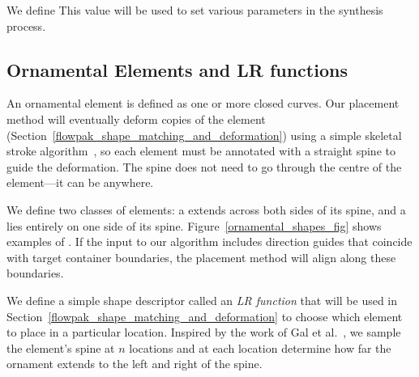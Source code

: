 We define 
This value will be used to set various parameters in the synthesis process.

\subsection{Ornamental Elements and LR functions}
\label{flowpak_ornamental_element_and_lr_functions}

An ornamental element is defined as one or more closed curves.  Our placement method will
eventually deform copies of the element (Section~\ref{flowpak_shape_matching_and_deformation}) 
using a simple skeletal stroke algorithm~\cite{Hsu1993},
so each element must be annotated with a straight spine to guide the deformation.  The spine
does not need to go through the centre of the element---it can be anywhere.

We define two classes of elements: a  extends across
both sides of its
spine, and a  lies entirely on one side of its spine.
Figure~\ref{ornamental_shapes_fig} shows examples of .  
If the input to our algorithm includes direction guides that coincide with target container boundaries,
the placement method will align  along these boundaries.  


We define a simple shape descriptor called an \textit{LR function}
that will be used in
Section~\ref{flowpak_shape_matching_and_deformation} to choose which element to place in a particular location. 
Inspired by the work of Gal et al.~\cite{Gal2007A}, we sample the element's
spine at $n$ locations and at each location determine how far the ornament extends to the
left and right of the spine. 


